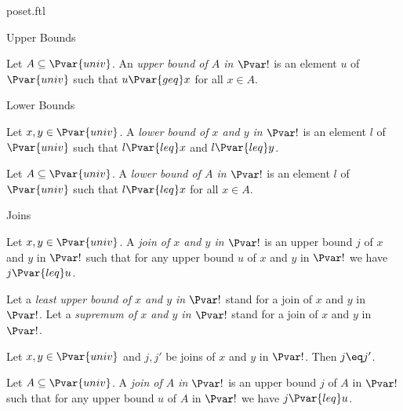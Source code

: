 \documentclass{naproche-library}
\begin{document}
\begin{smodule}[title=Posets]{poset.ftl}
\begin{sfragment}{Upper Bounds}
  \begin{definition*}[forthel,id=UpperBoundOfSetDef]
    Let $A \subseteq \Pvar{univ}$.
    An \emph{upper bound of $A$ in $\Pvar!$} is an element $u$ of $\Pvar{univ}$ such that $u {\Pvar{geq}} x$ for all $x \in A$.
  \end{definition*}
\end{sfragment}

\begin{sfragment}{Lower Bounds}
  \begin{definition*}[forthel,id=LowerBoundOfPairDef]
    Let $x, y \in \Pvar{univ}$.
    A \emph{lower bound of $x$ and $y$ in $\Pvar!$} is an element $l$ of $\Pvar{univ}$ such that $l {\Pvar{leq}} x$ and $l {\Pvar{leq}} y$.
  \end{definition*}
      
  \begin{definition*}[forthel,id=LowerBoundOfSetDef]
    Let $A \subseteq \Pvar{univ}$.
    A \emph{lower bound of $A$ in $\Pvar!$} is an element $l$ of $\Pvar{univ}$ such that $l {\Pvar{leq}} x$ for all $x \in A$.
  \end{definition*}
\end{sfragment}

\begin{sfragment}{Joins}
  \begin{definition*}[forthel,id=JoinOfPairDef]
    Let $x, y \in \Pvar{univ}$.
    A \emph{join of $x$ and $y$ in $\Pvar!$} is an upper bound $j$ of $x$ and $y$ in $\Pvar!$ such that for any upper bound $u$ of $x$ and $y$ in $\Pvar!$ we have $j {\Pvar{leq}} u$.

    Let a \emph{least upper bound of $x$ and $y$ in $\Pvar!$} stand for a join of $x$ and $y$ in $\Pvar!$.
    Let a \emph{supremum of $x$ and $y$ in $\Pvar!$} stand for a join of $x$ and $y$ in $\Pvar!$.
  \end{definition*}

  \begin{proposition*}[forthel,id=JoinOfPairIsUniqueThm]
    Let $x,y\in\Pvar{univ}$ and $j, j'$ be joins of $x$ and $y$ in $\Pvar!$.
    Then $j\eq j'$.
  \end{proposition*}
      
  \begin{definition*}[forthel,id=JoinOfSetDef]
    Let $A \subseteq \Pvar{univ}$.
    A \emph{join of $A$ in $\Pvar!$} is an upper bound $j$ of $A$ in $\Pvar!$ such that for any upper bound $u$ of $A$ in $\Pvar!$ we have $j {\Pvar{leq}} u$.


\end{definition*}
\end{sfragment}
\end{smodule}
\end{document}
